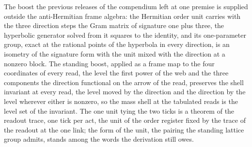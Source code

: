 The boost the previous releases of the compendium left at one premise is supplied outside the anti-Hermitian frame algebra: the Hermitian order unit carries with the three direction steps the Gram matrix of signature one plus three, the hyperbolic generator solved from it squares to the identity, and its one-parameter group, exact at the rational points of the hyperbola in every direction, is an isometry of the signature form with the unit mixed with the direction at a nonzero block.
The standing boost, applied as a frame map to the four coordinates of every read, the level the first power of the web and the three components the direction functional on the arrow of the read, preserves the shell invariant at every read, the level moved by the direction and the direction by the level wherever either is nonzero, so the mass shell at the tabulated reads is the level set of the invariant.
The one unit tying the two ticks is a theorem of the readout trace, one tick per act, the unit of the order register fixed by the trace of the readout at the one link; the form of the unit, the pairing the standing lattice group admits, stands among the words the derivation still owes.
